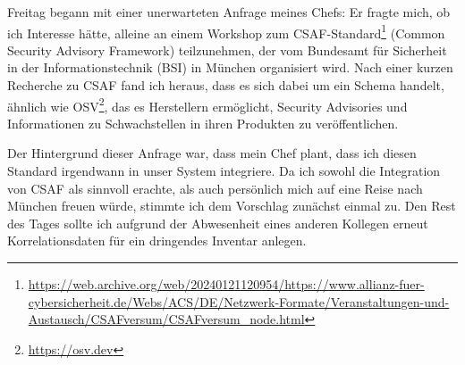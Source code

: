 \sweekdaymarginpar{\weekdayFridayLong}

Freitag begann mit einer unerwarteten Anfrage meines Chefs:
Er fragte mich, ob ich Interesse hätte, alleine an einem Workshop zum CSAF-Standard\footnote{\url{https://web.archive.org/web/20240121120954/https://www.allianz-fuer-cybersicherheit.de/Webs/ACS/DE/Netzwerk-Formate/Veranstaltungen-und-Austausch/CSAFversum/CSAFversum_node.html}} (Common Security Advisory Framework) teilzunehmen, der vom Bundesamt für Sicherheit in der Informationstechnik (BSI) in München organisiert wird.
Nach einer kurzen Recherche zu CSAF fand ich heraus, dass es sich dabei um ein Schema handelt, ähnlich wie OSV\footnote{\url{https://osv.dev}}, das es Herstellern ermöglicht, Security Advisories und Informationen zu Schwachstellen in ihren Produkten zu veröffentlichen.

Der Hintergrund dieser Anfrage war, dass mein Chef plant, dass ich diesen Standard irgendwann in unser System integriere.
Da ich sowohl die Integration von CSAF als sinnvoll erachte, als auch persönlich mich auf eine Reise nach München freuen würde, stimmte ich dem Vorschlag zunächst einmal zu.
Den Rest des Tages sollte ich aufgrund der Abwesenheit eines anderen Kollegen erneut Korrelationsdaten für ein dringendes Inventar anlegen.
